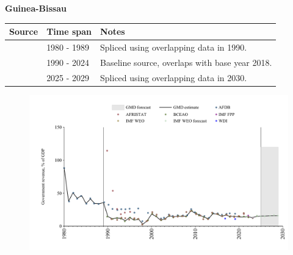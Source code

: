 \documentclass[12pt,a4paper,landscape]{article}
\begin{document}
\begin{adjustbox}{max totalsize={\paperwidth}{\paperheight},center}
\begin{minipage}[t][\textheight][t]{\textwidth}
\vspace*{0.5cm}
{}
\begin{center}
{\Large\bfseries Guinea-Bissau}
\end{center}
\vspace{0.5cm}
\begin{table}[H]
\centering
\small
\begin{tabular}{|l|l|l|}
\hline
\textbf{Source} & \textbf{Time span} & \textbf{Notes} \\
\hline
\rowcolor{white}\cite{AFDB}& 1980 - 1989 &Spliced using overlapping data in 1990.\\
\rowcolor{lightgray}\cite{BCEAO}& 1990 - 2024 &Baseline source, overlaps with base year 2018.\\
\rowcolor{white}\cite{IMF_WEO_forecast}& 2025 - 2029 &Spliced using overlapping data in 2030.\\
\hline
\end{tabular}
\end{table}
\begin{figure}[H]
\centering
\includegraphics[width=\textwidth,height=0.6\textheight,keepaspectratio]{graphs/GNB_govrev_GDP.pdf}
\end{figure}
\end{minipage}
\end{adjustbox}
\end{document}
